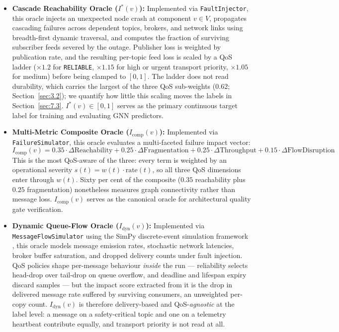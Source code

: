 \begin{itemize}
    \item \textbf{Cascade Reachability Oracle ($I^*(v)$):} Implemented via \texttt{FaultInjector}, this oracle injects an unexpected node crash at component $v \in V$, propagates cascading failures across dependent topics, brokers, and network links using breadth-first dynamic traversal, and computes the fraction of surviving subscriber feeds severed by the outage. Publisher loss is weighted by publication rate, and the resulting per-topic feed loss is scaled by a QoS ladder ($\times 1.2$ for \texttt{RELIABLE}, $\times 1.15$ for high or urgent transport priority, $\times 1.05$ for medium) before being clamped to $[0,1]$. The ladder does not read durability, which carries the largest of the three QoS sub-weights ($0.62$; Section~\ref{sec:3.2}); we quantify how little this scaling moves the labels in Section~\ref{sec:7.3}. $I^*(v) \in [0, 1]$ serves as the primary continuous target label for training and evaluating GNN predictors.
    \item \textbf{Multi-Metric Composite Oracle ($I_{\text{comp}}(v)$):} Implemented via \texttt{FailureSimulator}, this oracle evaluates a multi-faceted failure impact vector:
    \begin{equation}
    I_{\text{comp}}(v) = 0.35 \cdot \Delta\text{Reachability} + 0.25 \cdot \Delta\text{Fragmentation} + 0.25 \cdot \Delta\text{Throughput} + 0.15 \cdot \Delta\text{FlowDisruption}
    \end{equation}
    This is the most QoS-aware of the three: every term is weighted by an operational severity $s(t) = w(t) \cdot \text{rate}(t)$, so all three QoS dimensions enter through $w(t)$. Sixty per cent of the composite ($0.35$ reachability plus $0.25$ fragmentation) nonetheless measures graph connectivity rather than message loss. $I_{\text{comp}}(v)$ serves as the canonical oracle for architectural quality gate verification.
    \item \textbf{Dynamic Queue-Flow Oracle ($I_{\text{dyn}}(v)$):} Implemented via \texttt{MessageFlowSimulator} using the SimPy discrete-event simulation framework \cite{team2020simpy}, this oracle models message emission rates, stochastic network latencies, broker buffer saturation, and dropped delivery counts under fault injection. QoS policies shape per-message behaviour \emph{inside} the run --- reliability selects head-drop over tail-drop on queue overflow, and deadline and lifespan expiry discard samples --- but the impact score extracted from it is the drop in delivered message rate suffered by surviving consumers, an unweighted per-copy count. $I_{\text{dyn}}(v)$ is therefore delivery-based and QoS-\emph{agnostic} at the label level: a message on a safety-critical topic and one on a telemetry heartbeat contribute equally, and transport priority is not read at all.

\end{itemize}
